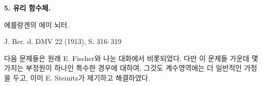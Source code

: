 
\begin{center}
{\Large\bfseries 5. 유리 함수체.}\par
\vspace{1.2em}
에를랑겐의 \textsc{에미 뇌터}.\par
\medskip
J. Ber. d. DMV 22 (1913), S. 316--319
\end{center}

\vspace{2em}

다음 문제들은 원래 E. Fischer와 나눈 대화에서 비롯되었다. 다만 이 문제들 가운데 몇 가지는 부정원이 하나인 특수한 경우에 대하여, 그것도 계수영역에는 더 일반적인 가정을 두고, 이미 E. Steinitz가 제기하고 해결하였다.
